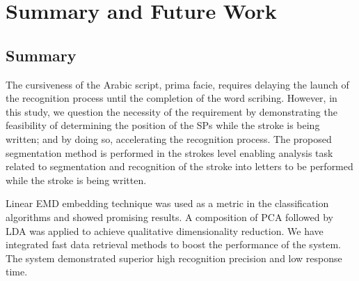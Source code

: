 %
%
%

\chapter{Summary and Future Work}
\label{chap:summary}

\section{Summary}
\label{sec:summary}

The cursiveness of the Arabic script, prima facie, requires delaying the launch of the recognition process until the completion of the word scribing. 
However, in this study, we question the necessity of the requirement by demonstrating the feasibility of determining the position of the SPs while the stroke is being written; and by doing so, accelerating the recognition process.
The proposed segmentation method is performed in the strokes level enabling analysis task related to segmentation and recognition of the stroke into letters to be performed while the stroke is being written. 

Linear EMD embedding technique was used as a metric in the classification algorithms and showed promising results.
A composition of PCA followed by LDA was applied to achieve qualitative dimensionality reduction. 
We have integrated fast data retrieval methods to boost the performance of the system. 
The system demonstrated superior high recognition precision and low response time.

